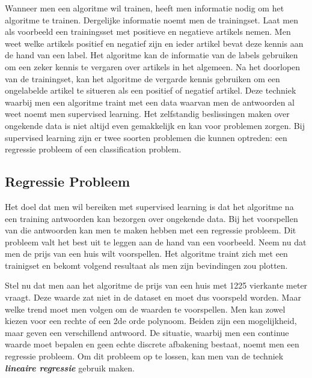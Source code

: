 Wanneer men een algoritme wil trainen, heeft men informatie nodig om het algoritme te trainen. Dergelijke informatie noemt men de trainingset.
\newline
Laat men als voorbeeld een trainingsset met positieve en negatieve artikels nemen. Men weet welke artikels positief en negatief zijn en ieder artikel bevat deze kennis aan de hand van een label. Het algoritme kan de informatie van de labels gebruiken om een zeker kennis te vergaren over artikels in het algemeen. Na het doorlopen van de trainingset, kan het algoritme de vergarde kennis gebruiken om een ongelabelde artikel te situeren als een positief of negatief artikel.
\newline
Deze techniek waarbij men een algoritme traint met een data waarvan men de antwoorden al weet noemt men supervised learning.
\newline
Het zelfstandig beslissingen maken over ongekende data is niet altijd even gemakkelijk en kan voor problemen zorgen. 
Bij supervised learning zijn er twee soorten problemen die kunnen optreden: een regressie probleem of een classification problem.

\subsection{Regressie Probleem}\label{Regressie Probleem}

Het doel dat men wil bereiken met supervised learning is dat het algoritme na een training antwoorden kan bezorgen over ongekende data. Bij het voorspellen van die antwoorden kan men te maken hebben met een regressie probleem. Dit probleem valt het best uit te leggen aan de hand van een voorbeeld. Neem nu dat men de prijs van een huis wilt voorspellen.
Het algoritme traint zich met een trainigset en bekomt volgend resultaat als men zijn bevindingen zou plotten.
\newline

\newline
Stel nu dat men aan het algoritme de prijs van een huis met 1225 vierkante meter vraagt. Deze waarde zat niet in de dataset en moet dus voorspeld worden. Maar welke trend moet men volgen om de waarden te voorspellen. Men kan zowel kiezen voor een rechte of een 2de orde polynoom. Beiden zijn een mogelijkheid, maar geven een verschillend antwoord. De situatie, waarbij men een continue waarde moet bepalen en geen echte discrete afbakening bestaat, noemt men een regressie probleem.
\newline
Om dit probleem op te lossen, kan men van de techniek \textbf{\textit{lineaire regressie}} gebruik maken.

